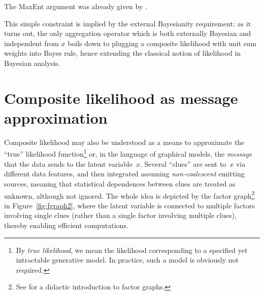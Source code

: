 \documentclass[english]{scrartcl}
\begin{document}
The MaxEnt argument was already given by \cite{Wang-14}. 

This simple constraint is implied by the external Bayesianity requirement: as it turns out, the only aggregation operator which is both externally Bayesian and independent from $x$ boils down to plugging a composite likelihood with unit sum weights into Bayes rule, hence extending the classical notion of likelihood in Bayesian analysis.


\section{Composite likelihood as message approximation}
\label{sec:message}

Composite likelihood may also be understood as a means to approximate the ``true'' likelihood function\footnote{By {\em true likelihood}, we mean the likelihood corresponding to a specified yet intractable generative model. In practice, such a model is obviously not required.} or, in the language of graphical models, the {\em message} that the data sends to the latent variable~$x$. Several ``clues'' are sent to~$x$ via different data features, and then integrated assuming {\em non-coalescent} emitting sources, meaning that statistical dependences between clues are treated as unknown, although not ignored. The whole idea is depicted by the factor graph\footnote{See \cite{Bishop-06} for a didactic introduction to factor graphs.} in Figure~\ref{fig:fgraph2}, where the latent variable is connected to multiple factors involving single clues (rather than a single factor involving multiple clues), thereby enabling efficient computations.

\end{document}
